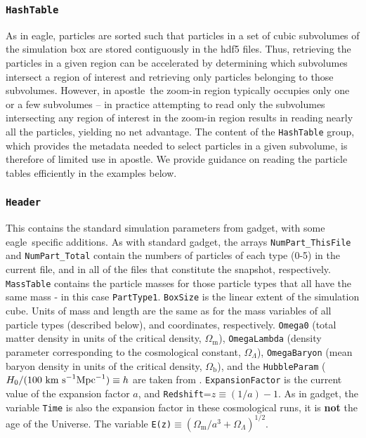 \documentclass[10pt, a4paper]{article}
\newcommand{\eagle}{{\sc eagle}}
\newcommand{\apostle}{{\sc apostle}}
\newcommand{\gadget}{{\sc gadget}}
\begin{document}
\subsubsection{\texttt{HashTable}}
\label{sect:hash_table}
As in \eagle, particles are sorted such that particles in a set of cubic subvolumes
of the simulation box are stored contiguously in the hdf5 files. Thus, retrieving
the particles in a given region can be accelerated by determining which subvolumes
intersect a region of interest and retrieving only particles belonging to those
subvolumes. However, in \apostle\ the zoom-in region typically occupies only one
or a few subvolumes -- in practice attempting to read only the subvolumes intersecting
any region of interest in the zoom-in region results in reading nearly all
the particles, yielding no net advantage. The content of the \texttt{HashTable} group,
which provides the metadata needed to select particles in a given subvolume,
is therefore of limited use in \apostle. We provide guidance on reading the particle
tables efficiently in the examples below.

\subsubsection{\texttt{Header}}
\label{sect:header}
This contains the standard simulation parameters from \gadget, with some
\eagle\ specific additions. As with standard \gadget, the arrays
\texttt{NumPart\_ThisFile} and \texttt{NumPart\_Total} contain the numbers of
particles of each type (0-5) in the current file, and in all of the files that
constitute the snapshot, respectively. \texttt{MassTable} contains the particle
masses for those particle types that all have the same mass - in this case
\texttt{PartType1}. \texttt{BoxSize} is the linear extent of the simulation
cube. Units of mass and length are the same as for the mass variables of all
particle types (described below), and coordinates, respectively.
\texttt{Omega0} (total matter density in units of the critical density,
$\Omega_{\mathrm{m}}$), \texttt{OmegaLambda} (density parameter corresponding
to the cosmological constant, $\Omega_\Lambda$), \texttt{OmegaBaryon} (mean
baryon density in units of the critical density, $\Omega_{\mathrm{b}}$), and
the \texttt{HubbleParam} ($H_0/(100~{\rm km~s}^{-1}{\rm Mpc}^{-1})\equiv h$ are
taken from \cite{WMAP7}. \texttt{ExpansionFactor} is the current value of
the expansion factor $a$, and \texttt{Redshift}=$z\equiv (1/a) - 1$. As in
\gadget, the variable \texttt{Time} is also the expansion factor in these
cosmological runs, it is {\bf not} the age of the Universe. The variable
\texttt{E(z)}$\equiv (\Omega_{\mathrm{m}}/a^3+\Omega_\Lambda)^{1/2}$.
\end{document}
